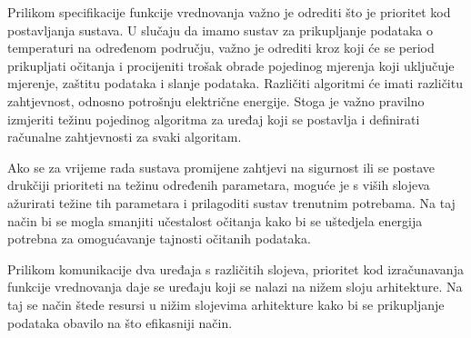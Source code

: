 Prilikom specifikacije funkcije vrednovanja važno je odrediti što je prioritet
kod postavljanja sustava. U slučaju da imamo sustav za prikupljanje podataka o
temperaturi na određenom području, važno je odrediti kroz koji će se period
prikupljati očitanja i procijeniti trošak obrade pojedinog mjerenja koji
uključuje mjerenje, zaštitu podataka i slanje podataka. Različiti algoritmi
će imati različitu zahtjevnost, odnosno potrošnju električne energije. Stoga je
važno pravilno izmjeriti težinu pojedinog algoritma za uređaj koji se postavlja
i definirati računalne zahtjevnosti za svaki algoritam.

Ako se za vrijeme rada sustava promijene zahtjevi na sigurnost ili se postave
drukčiji prioriteti na težinu određenih parametara, moguće je s viših slojeva
ažurirati težine tih parametara i prilagoditi sustav trenutnim potrebama. Na taj
način bi se mogla smanjiti učestalost očitanja kako bi se uštedjela energija
potrebna za omogućavanje tajnosti očitanih podataka.

Prilikom komunikacije dva uređaja s različitih slojeva, prioritet kod izračunavanja
funkcije vrednovanja daje se uređaju koji se nalazi na nižem sloju arhitekture.
Na taj se način štede resursi u nižim slojevima arhitekture kako bi se
prikupljanje podataka obavilo na što efikasniji način.

